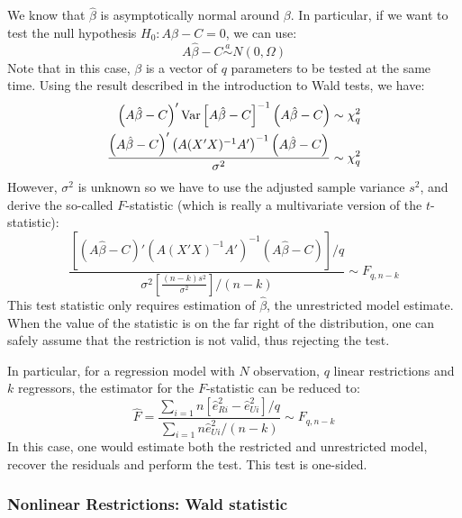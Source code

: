 We know that $\hat\beta$ is asymptotically normal around $\beta$. In particular, if we want to test the null hypothesis $H_0:A\beta - C = 0$, we can use: $$ A\hat\beta - C \overset{a}{\sim} N(0,\Omega) $$ Note that in this case, $\beta$ is a vector of $q$ parameters to be tested at the same time. Using the result described in the introduction to Wald tests, we have:\begin{align*}
\left(A\hat\beta - C\right)'\operatorname{Var}\left[A\hat\beta - C\right]^{-1}\left(A\hat\beta - C\right) & \sim \chi_q^2 \\
\frac{\left(A\hat\beta - C\right)'\left(A(X'X)^{-1}A'\right)^{-1}\left(A\hat\beta - C\right)}{\sigma^2} & \sim \chi_q^2 \\
\end{align*} However, $\sigma^2$ is unknown so we have to use the adjusted sample variance $s^2$, and derive the so-called $F$-statistic (which is really a multivariate version of the $t$-statistic): $$ \frac{\left[\left(A\hat\beta - C\right)'\left(A(X'X)^{-1}A'\right)^{-1}\left(A\hat\beta - C\right)\right]/q}{\sigma^2\left[\frac{(n-k)s^2}{\sigma^2}\right]/(n-k)} \sim F_{q, n-k} $$
This test statistic only requires estimation of $\hat\beta$, the unrestricted model estimate. When the value of the statistic is on the far right of the distribution, one can safely assume that the restriction is not valid, thus rejecting the test.

In particular, for a regression model with $N$ observation, $q$ linear restrictions and $k$ regressors, the estimator for the $F$-statistic can be reduced to: $$\hat F = \frac{\sum_{i=1}{n}\left[\hat e_{Ri}^2 - \hat e_{Ui}^2\right]/q}{\sum_{i=1}{n}\hat e_{Ui}^2/(n - k)} \sim F_{q, n-k} $$
In this case, one would estimate both the restricted and unrestricted model, recover the residuals and perform the test. This test is one-sided.

\subsubsection{Nonlinear Restrictions: Wald statistic}

